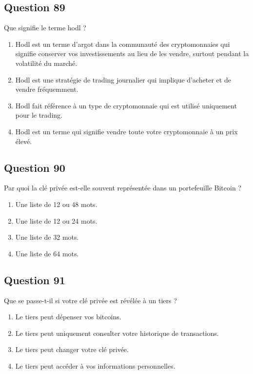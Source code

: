 \documentclass[12pt,a4paper]{article}
\begin{document}
\bigskip


\subsection*{Question 89}
Que signifie le terme hodl ?

\begin{enumerate}[label=\Alph*., leftmargin=*]
\item Hodl est un terme d'argot dans la communauté des cryptomonnaies qui signifie conserver vos investissements au lieu de les vendre, surtout pendant la volatilité du marché.
\item Hodl est une stratégie de trading journalier qui implique d'acheter et de vendre fréquemment.
\item Hodl fait référence à un type de cryptomonnaie qui est utilisé uniquement pour le trading.
\item Hodl est un terme qui signifie vendre toute votre cryptomonnaie à un prix élevé.
\end{enumerate}

\bigskip


\subsection*{Question 90}
Par quoi la clé privée est-elle souvent représentée dans un portefeuille Bitcoin ?

\begin{enumerate}[label=\Alph*., leftmargin=*]
\item Une liste de 12 ou 48 mots.
\item Une liste de 12 ou 24 mots.
\item Une liste de 32 mots.
\item Une liste de 64 mots.
\end{enumerate}

\bigskip


\subsection*{Question 91}
Que se passe-t-il si votre clé privée est révélée à un tiers ?

\begin{enumerate}[label=\Alph*., leftmargin=*]
\item Le tiers peut dépenser vos bitcoins.
\item Le tiers peut uniquement consulter votre historique de transactions.
\item Le tiers peut changer votre clé privée.
\item Le tiers peut accéder à vos informations personnelles.
\end{enumerate}
\end{document}
